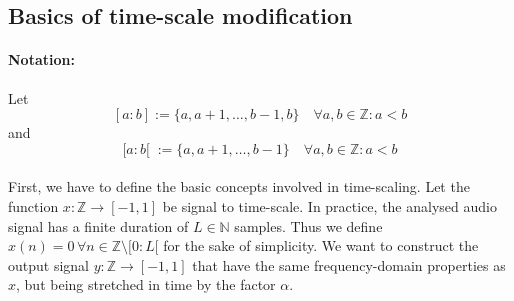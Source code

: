 \documentclass[letterpaper]{article}
\begin{document}
\subsection{Basics of time-scale modification}
\paragraph{Notation:} Let
\[[a:b]:=\{a,a+1,\dots,b-1,b\}\quad\forall a,b\in\mathbb{Z}:a<b\]
and
\[[a:b[\;:=\{a,a+1,\dots,b-1\}\quad\forall a,b\in\mathbb{Z}:a<b\]

\paragraph{}
First, we have to define the basic concepts involved in time-scaling. Let the
function \(x:\mathbb{Z}\to[-1, 1]\) be signal to time-scale. In practice,
the analysed audio signal has a finite duration of \(L\in\mathbb{N}\) samples.
Thus we define \(x(n)=0\,\forall n\in\mathbb{Z}\setminus [0:L[ \) for the sake
of simplicity. We want to construct the output signal
\(y:\mathbb{Z}\to[-1, 1]\) that have the same frequency-domain properties as
\(x\), but being stretched in time by the factor \(\alpha\).
\end{document}
